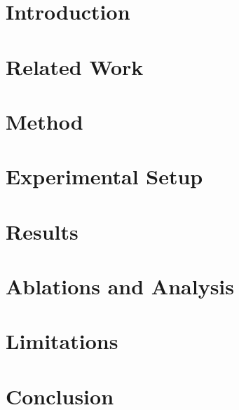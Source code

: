 \documentclass[conference]{IEEEtran}
\begin{document}
\title{}

\author{}

\maketitle

\begin{abstract}

\end{abstract}

\begin{IEEEkeywords}

\end{IEEEkeywords}

\section{Introduction}\label{sec:intro}


\section{Related Work}\label{sec:related}


\section{Method}\label{sec:method}


\section{Experimental Setup}\label{sec:setup}


\section{Results}\label{sec:results}


\section{Ablations and Analysis}\label{sec:ablations}


\section{Limitations}\label{sec:limitations}


\section{Conclusion}\label{sec:conclusion}


\footnotesize


\end{document}
